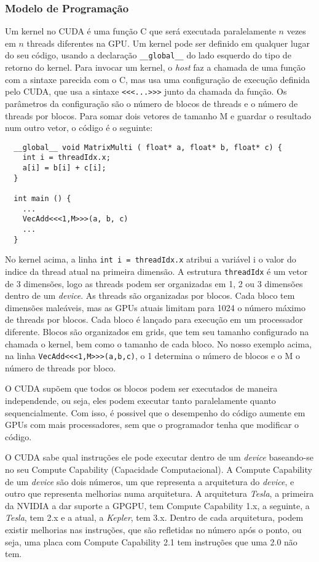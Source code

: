 \subsubsection{Modelo de Programação}
Um kernel no CUDA é uma função C que será executada paralelamente $n$ vezes em $n$ threads diferentes na GPU. Um kernel pode ser
definido em qualquer lugar do seu código, usando a declaração \verb#__global__# do lado esquerdo do tipo de retorno do kernel.
Para invocar um kernel, o \textit{host} faz a chamada de uma função com a sintaxe parecida com o C, mas usa uma configuração de
execução definida pelo CUDA, que usa a sintaxe \verb#<<<...>>># junto da chamada da função. Os parâmetros da configuração são
o número de blocos de threads e o número de threads por blocos. Para somar dois vetores de tamanho M e guardar o resultado num
outro vetor, o código é o seguinte:

\begin{verbatim}
  __global__ void MatrixMulti ( float* a, float* b, float* c) { 
    int i = threadIdx.x;
    a[i] = b[i] + c[i];        
  }
                            
  int main () {               
    ...                       
    VecAdd<<<1,M>>>(a, b, c)  
    ...                       
  }                                 
\end{verbatim}

No kernel acima, a linha \verb#int i = threadIdx.x# atribui a variável i o valor do indice da thread atual na primeira dimensão. 
A estrutura \verb#threadIdx# é um vetor de 3 dimensões, logo as threads podem ser organizadas em 1, 2 ou 3 dimensões dentro de um
\textit{device}. As threads são organizadas por blocos. Cada bloco tem dimensões maleáveis, mas as GPUs atuais limitam para 1024 o 
número máximo de threads por blocos. Cada bloco é lançado para execução em um processador diferente. Blocos são organizados em 
grids, que tem seu tamanho configurado na chamada o kernel, bem como o tamanho de cada bloco. No nosso exemplo acima, na linha
\verb#VecAdd<<<1,M>>>(a,b,c)#, o 1 determina o número de blocos e o M o número de threads por bloco.

O CUDA supõem que todos os blocos podem ser executados de maneira independende, ou seja, eles podem executar tanto paralelamente
quanto sequencialmente. Com isso, é possivel que o desempenho do código aumente em GPUs com mais processadores, sem que o programador
tenha que modificar o código.

O CUDA sabe qual instruções ele pode executar dentro de um \textit{device} baseando-se no seu Compute Capability 
(Capacidade Computacional). A Compute Capability de um \textit{device} são dois números, um que representa a arquitetura do 
\textit{device}, e outro que representa melhorias numa arquitetura.
A arquitetura \textit{Tesla}, a primeira da NVIDIA a dar suporte a GPGPU, tem Compute Capability 1.x, a seguinte, a \textit{Tesla},
tem 2.x e a atual, a \textit{Kepler}, tem 3.x. Dentro de cada arquitetura, podem existir melhorias nas instruções, que são
refletidas no número após o ponto, ou seja, uma placa com Compute Capability 2.1 tem instruções que uma 2.0 não tem.

